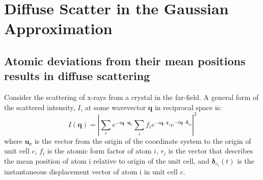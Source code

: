 \documentclass{article}
\begin{document}
\section{Diffuse Scatter in the Gaussian Approximation}

\subsection{Atomic deviations from their mean positions results in diffuse scattering}

Consider the scattering of x-rays from a crystal in the far-field. A general form of the scattered intensity, $I$, at some wavevector $\mathbf{q}$ in reciprocal space is:
\begin{equation}
I(\mathbf{q}) = \left| \sum\limits_{c} e^{-i \mathbf{q} \cdot \mathbf{u_c} } \sum\limits_{i} f_i e^{-i \mathbf{q} \cdot \mathbf{r}_i} e^{-i \mathbf{q} \cdot \boldsymbol{\delta_{c_i}}} \right| ^2
\end{equation}
where $\mathbf{u_c}$ is the vector from the origin of the coordinate system to the origin of unit cell $c$, $f_i$ is the atomic form factor of atom $i$, $r_i$ is the vector that describes the mean position of atom i relative to origin of the unit cell, and $\boldsymbol{\delta}_{c_i}(t)$ is the instantaneous displacement vector of atom i in unit cell $c$.
\end{document}
